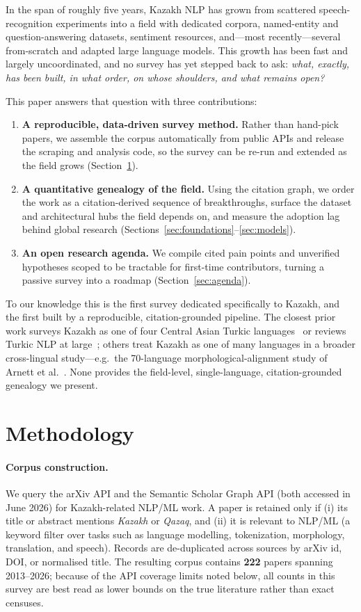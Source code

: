 \documentclass{article}
\begin{document}
In the span of roughly five years, Kazakh NLP has grown from scattered speech-recognition
experiments into a field with dedicated corpora, named-entity and question-answering
datasets, sentiment resources, and---most recently---several from-scratch and adapted
large language models. This growth has been fast and largely uncoordinated, and no
survey has yet stepped back to ask: \emph{what, exactly, has been built, in what order,
on whose shoulders, and what remains open?}

This paper answers that question with three contributions:
\begin{enumerate}
  \item \textbf{A reproducible, data-driven survey method.} Rather than hand-pick papers,
  we assemble the corpus automatically from public APIs and release the scraping and
  analysis code, so the survey can be re-run and extended as the field grows
  (Section~\ref{sec:method}).
  \item \textbf{A quantitative genealogy of the field.} Using the citation graph, we order
  the work as a citation-derived sequence of breakthroughs, surface the dataset and
  architectural hubs the field depends on, and measure the adoption lag behind global research
  (Sections~\ref{sec:foundations}--\ref{sec:models}).
  \item \textbf{An open research agenda.} We compile cited pain points and unverified
  hypotheses scoped to be tractable for first-time contributors, turning a passive survey
  into a roadmap (Section~\ref{sec:agenda}).
\end{enumerate}

To our knowledge this is the first survey dedicated specifically to Kazakh, and the first
built by a reproducible, citation-grounded pipeline. The closest prior work surveys Kazakh
as one of four Central Asian Turkic languages~\cite{loreslm} or reviews Turkic NLP at
large~\cite{turkicreview}; others treat Kazakh as one of many languages in a broader
cross-lingual study---e.g.\ the 70-language morphological-alignment study of Arnett et
al.~\cite{arnett70}. None provides the field-level, single-language, citation-grounded
genealogy we present.

\section{Methodology}
\label{sec:method}
\paragraph{Corpus construction.}
We query the arXiv API and the Semantic Scholar Graph API (both accessed in June 2026) for
Kazakh-related NLP/ML work. A paper is retained only if (i) its title or abstract mentions
\emph{Kazakh} or \emph{Qazaq}, and (ii) it is relevant to NLP/ML (a keyword filter over
tasks such as language modelling, tokenization, morphology, translation, and speech).
Records are de-duplicated across sources by arXiv id, DOI, or normalised title. The
resulting corpus contains \textbf{222} papers spanning 2013--2026; because of the API
coverage limits noted below, all counts in this survey are best read as lower bounds on the
true literature rather than exact censuses.
\end{document}
